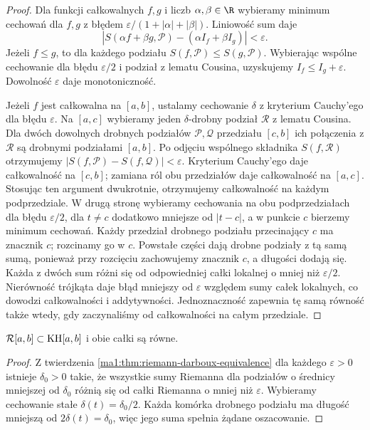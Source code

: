 \begin{proof}
Dla funkcji całkowalnych $f,g$ i liczb $\alpha,\beta\in\R$ wybieramy minimum cechowań dla $f,g$ z błędem $\varepsilon/(1+|\alpha|+|\beta|)$. Liniowość sum daje
\[
 |S(\alpha f+\beta g,\mathcal P)-(\alpha I_f+\beta I_g)|
 <\varepsilon.
\]
Jeżeli $f\le g$, to dla każdego podziału $S(f,\mathcal P)\le S(g,\mathcal P)$. Wybierając wspólne cechowanie dla błędu $\varepsilon/2$ i podział z lematu Cousina, uzyskujemy $I_f\le I_g+\varepsilon$. Dowolność $\varepsilon$ daje monotoniczność.

Jeżeli $f$ jest całkowalna na $[a,b]$, ustalamy cechowanie $\delta$ z kryterium Cauchy'ego dla błędu $\varepsilon$. Na $[a,c]$ wybieramy jeden $\delta$-drobny podział $\mathcal R$ z lematu Cousina. Dla dwóch dowolnych drobnych podziałów $\mathcal P,\mathcal Q$ przedziału $[c,b]$ ich połączenia z $\mathcal R$ są drobnymi podziałami $[a,b]$. Po odjęciu wspólnego składnika $S(f,\mathcal R)$ otrzymujemy $|S(f,\mathcal P)-S(f,\mathcal Q)|<\varepsilon$. Kryterium Cauchy'ego daje całkowalność na $[c,b]$; zamiana ról obu przedziałów daje całkowalność na $[a,c]$. Stosując ten argument dwukrotnie, otrzymujemy całkowalność na każdym podprzedziale. W drugą stronę wybieramy cechowania na obu podprzedziałach dla błędu $\varepsilon/2$, dla $t\ne c$ dodatkowo mniejsze od $|t-c|$, a w punkcie $c$ bierzemy minimum cechowań. Każdy przedział drobnego podziału przecinający $c$ ma znacznik $c$; rozcinamy go w $c$. Powstałe części dają drobne podziały z tą samą sumą, ponieważ przy rozcięciu zachowujemy znacznik $c$, a długości dodają się. Każda z dwóch sum różni się od odpowiedniej całki lokalnej o mniej niż $\varepsilon/2$. Nierówność trójkąta daje błąd mniejszy od $\varepsilon$ względem sumy całek lokalnych, co dowodzi całkowalności i addytywności. Jednoznaczność zapewnia tę samą równość także wtedy, gdy zaczynaliśmy od całkowalności na całym przedziale.
\end{proof}
\begin{stwierdzenie}
$\mathcal R[a,b]\subset\mathrm{KH}[a,b]$ i obie całki są równe.
\end{stwierdzenie}
\begin{proof}
Z twierdzenia \ref{ma1:thm:riemann-darboux-equivalence} dla każdego $\varepsilon>0$ istnieje $\delta_0>0$ takie, że wszystkie sumy Riemanna dla podziałów o średnicy mniejszej od $\delta_0$ różnią się od całki Riemanna o mniej niż $\varepsilon$. Wybieramy cechowanie stałe $\delta(t)=\delta_0/2$. Każda komórka drobnego podziału ma długość mniejszą od $2\delta(t)=\delta_0$, więc jego suma spełnia żądane oszacowanie.
\end{proof}
